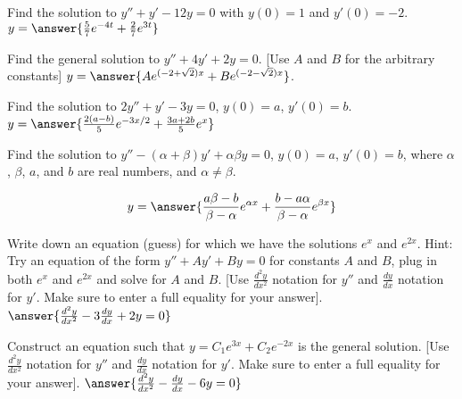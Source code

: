 \documentclass{ximera}
\begin{document}
\begin{exercise}
    Find the solution to $y'' + y' -12y = 0$ with $y(0) = 1$ and $y'(0) = -2$. $y = \answer{\frac{5}{7}e^{-4t} + \frac{2}{7}e^{3t}}$
\end{exercise}
\begin{exercise}%
    Find the general solution to $y''+4y'+2y=0$. [Use $A$ and $B$ for the arbitrary constants] $y = \answer{A e^{(-2+\sqrt{2}) x} + B e^{(-2-\sqrt{2}) x}}$.
\end{exercise}

\begin{exercise}%
    Find the solution to $2y''+y'-3y=0$, $y(0) = a$, $y'(0)=b$. $y = \answer{\frac{2(a-b)}{5} e^{-3x/2}+\frac{3 a+2 b}{5} e^x}$
\end{exercise}

\begin{exercise}%
    Find the solution to $y''-(\alpha+\beta) y' + \alpha \beta y=0$, $y(0) = a$, $y'(0)=b$, where $\alpha$, $\beta$, $a$, and $b$ are real numbers, and $\alpha \neq \beta$. 
    
    \[
        y = \answer{\frac{a \beta-b}{\beta-\alpha} e^{\alpha x} + \frac{b-a \alpha}{\beta-\alpha} e^{\beta x}}
    \]
\end{exercise}

\begin{exercise}%
    Write down an equation (guess) for which we have the solutions $e^x$ and $e^{2x}$.  Hint: Try an equation of the form $y''+Ay'+By = 0$ for constants $A$ and $B$, plug in both $e^x$ and $e^{2x}$ and solve for $A$ and $B$. [Use $\frac{d^2y}{dx^2}$ notation for $y''$ and $\frac{dy}{dx}$ notation for $y'$. Make sure to enter a full equality for your answer]. $\answer{\frac{d^2y}{dx^2} - 3\frac{dy}{dx} + 2y = 0}$
\end{exercise}

\begin{exercise}%
    Construct an equation such that $y = C_1 e^{3x} + C_2 e^{-2x}$ is the general solution. [Use $\frac{d^2y}{dx^2}$ notation for $y''$ and $\frac{dy}{dx}$ notation for $y'$. Make sure to enter a full equality for your answer]. $\answer{\frac{d^2y}{dx^2} - \frac{dy}{dx} - 6y = 0}$
\end{exercise}
\end{document}
